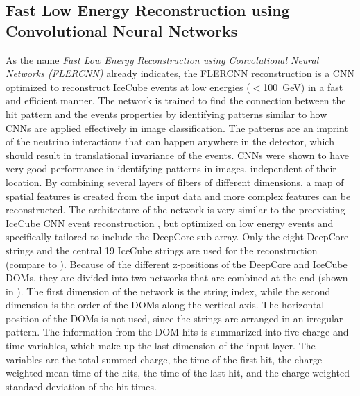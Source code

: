 \subsection{Fast Low Energy Reconstruction using Convolutional Neural Networks} 

As the name \textit{Fast Low Energy Reconstruction using Convolutional Neural Networks (FLERCNN)} already indicates, the FLERCNN reconstruction  is a CNN optimized to reconstruct IceCube events at low energies ($<$\SI{100}{\giga\electronvolt}) in a fast and efficient manner. The network is trained to find the connection between the hit pattern and the events properties by identifying patterns similar to how CNNs are applied effectively in image classification. The patterns are an imprint of the neutrino interactions that can happen anywhere in the detector, which should result in translational invariance of the events. CNNs were shown to have very good performance in identifying patterns in images, independent of their location. By combining several layers of filters of different dimensions, a map of spatial features is created from the input data and more complex features can be reconstructed. The architecture of the network is very similar to the preexisting IceCube CNN event reconstruction , but optimized on low energy events and specifically tailored to include the DeepCore sub-array. Only the eight DeepCore strings and the central 19 IceCube strings are used for the reconstruction (compare to ). Because of the different z-positions of the DeepCore and IceCube DOMs, they are divided into two networks that are combined at the end (shown in ). The first dimension of the network is the string index, while the second dimension is the order of the DOMs along the vertical axis. The horizontal position of the DOMs is not used, since the strings are arranged in an irregular pattern. The information from the DOM hits is summarized into five charge and time variables, which make up the last dimension of the input layer. The variables are the total summed charge, the time of the first hit, the charge weighted mean time of the hits, the time of the last hit, and the charge weighted standard deviation of the hit times.


